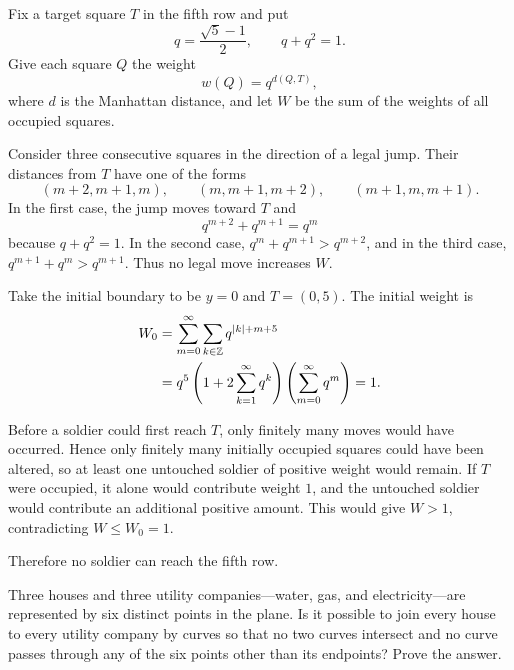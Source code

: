     \begin{solution}
        Fix a target square $T$ in the fifth row and put
        \[
            q=\frac{\sqrt5-1}{2},
            \qquad
            q+q^2=1.
        \]
        Give each square $Q$ the weight
        \[
            w(Q)=q^{d(Q,T)},
        \]
        where $d$ is the Manhattan distance, and let $W$ be the sum of the
        weights of all occupied squares.

        Consider three consecutive squares in the direction of a legal jump.
        Their distances from $T$ have one of the forms
        \[
            (m+2,m+1,m),
            \qquad
            (m,m+1,m+2),
            \qquad
            (m+1,m,m+1).
        \]
        In the first case, the jump moves toward $T$ and
        \[
            q^{m+2}+q^{m+1}=q^m
        \]
        because $q+q^2=1$. In the second case,
        $q^m+q^{m+1}>q^{m+2}$, and in the third case,
        $q^{m+1}+q^m>q^{m+1}$. Thus no legal move increases $W$.

        Take the initial boundary to be $y=0$ and $T=(0,5)$. The initial weight
        is
        \[
            \begin{aligned}
                W_0
                &=
                \sum_{m=0}^{\infty}\sum_{k\in\mathbb{Z}}q^{|k|+m+5}\\
                &=
                q^5
                \left(1+2\sum_{k=1}^{\infty}q^k\right)
                \left(\sum_{m=0}^{\infty}q^m\right)
                =1.
            \end{aligned}
        \]

        Before a soldier could first reach $T$, only finitely many moves would
        have occurred. Hence only finitely many initially occupied squares
        could have been altered, so at least one untouched soldier of positive
        weight would remain. If $T$ were occupied, it alone would contribute
        weight $1$, and the untouched soldier would contribute an additional
        positive amount. This would give $W>1$, contradicting $W\leq W_0=1$.

        Therefore no soldier can reach the fifth row.
    \end{solution}

    \begin{expectedproblem}
        Three houses and three utility companies---water, gas, and
        electricity---are represented by six distinct points in the plane. Is
        it possible to join every house to every utility company by curves so
        that no two curves intersect and no curve passes through any of the six
        points other than its endpoints? Prove the answer.
    \end{expectedproblem}

